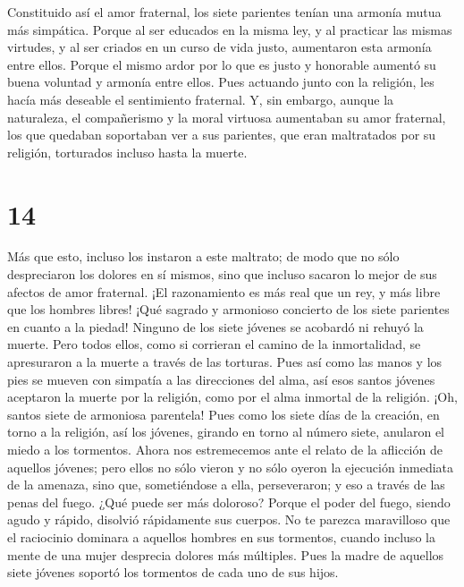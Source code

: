  Constituido así el amor fraternal, los siete parientes
tenían una armonía mutua más simpática.  Porque al ser
educados en la misma ley, y al practicar las mismas virtudes, y al ser
criados en un curso de vida justo, aumentaron esta armonía entre ellos.
 Porque el mismo ardor por lo que es justo y honorable
aumentó su buena voluntad y armonía entre ellos.  Pues
actuando junto con la religión, les hacía más deseable el sentimiento
fraternal.  Y, sin embargo, aunque la naturaleza, el
compañerismo y la moral virtuosa aumentaban su amor fraternal, los que
quedaban soportaban ver a sus parientes, que eran maltratados por su
religión, torturados incluso hasta la muerte.

\hypertarget{section-13}{%
\section{14}\label{section-13}}

 Más que esto, incluso los instaron a este maltrato; de
modo que no sólo despreciaron los dolores en sí mismos, sino que incluso
sacaron lo mejor de sus afectos de amor fraternal.  ¡El
razonamiento es más real que un rey, y más libre que los hombres libres!
 ¡Qué sagrado y armonioso concierto de los siete parientes
en cuanto a la piedad!  Ninguno de los siete jóvenes se
acobardó ni rehuyó la muerte.  Pero todos ellos, como si
corrieran el camino de la inmortalidad, se apresuraron a la muerte a
través de las torturas.  Pues así como las manos y los
pies se mueven con simpatía a las direcciones del alma, así esos santos
jóvenes aceptaron la muerte por la religión, como por el alma inmortal
de la religión.  ¡Oh, santos siete de armoniosa parentela!
Pues como los siete días de la creación, en torno a la religión,
 así los jóvenes, girando en torno al número siete,
anularon el miedo a los tormentos.  Ahora nos estremecemos
ante el relato de la aflicción de aquellos jóvenes; pero ellos no sólo
vieron y no sólo oyeron la ejecución inmediata de la amenaza, sino que,
sometiéndose a ella, perseveraron; y eso a través de las penas del
fuego.  ¿Qué puede ser más doloroso? Porque el poder del
fuego, siendo agudo y rápido, disolvió rápidamente sus cuerpos.
 No te parezca maravilloso que el raciocinio dominara a
aquellos hombres en sus tormentos, cuando incluso la mente de una mujer
desprecia dolores más múltiples.  Pues la madre de
aquellos siete jóvenes soportó los tormentos de cada uno de sus hijos.

